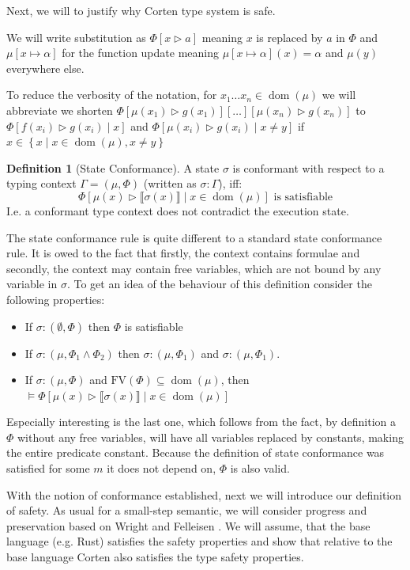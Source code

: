 \documentclass[twoside, english]{sdqthesis}
\newcommand{\set}[1]{\left\{ #1 \right\}}
\newcommand{\bbracket}[1]{\llbracket #1 \rrbracket}
\newcommand{\tr}[0]{\triangleright}
\DeclareMathOperator{\dom}{dom}
\theoremstyle{definition}
\newtheorem{definition}[theorem]{Definition}
\begin{document}
Next, we will to justify why Corten type system is safe.


We will write substitution as $\Phi[ x \tr a ]$ meaning $x$ is replaced by $a$ in $\Phi$ and $\mu[x \mapsto \alpha]$ for the function update meaning $\mu[x \mapsto \alpha](x) = \alpha$ and $\mu(y)$ everywhere else.

To reduce the verbosity of the notation, for $x_1 \dots x_n \in \dom(\mu)$ we will abbreviate
we shorten $\Phi[\mu(x_1) \tr g(x_1)][\dots][\mu(x_n) \tr g(x_n)]$ to $\Phi[f(x_i) \tr g(x_i) \mid x]$ and $\Phi[\mu(x_i) \tr g(x_i) \mid x \neq y]$ if $x \in \set{ x \mid x \in \dom(\mu), x \neq y }$



\begin{definition}[State Conformance]\label{def:state-conformance}
  A state $\sigma$ is conformant with respect to a typing context $\Gamma = (\mu, \Phi)$ (written as $\sigma : \Gamma$), iff:
  $$
    \Phi[\mu(x) \triangleright \bbracket{\sigma(x)} \mid x \in \dom(\mu)] \text{ is satisfiable}
  $$
  I.e. a conformant type context does not contradict the execution state.
\end{definition}

The state conformance rule is quite different to a standard state conformance rule. It is owed to the fact that firstly, the context contains formulae and secondly, the context may contain free variables, which are not bound by any variable in $\sigma$.
To get an idea of the behaviour of this definition consider the following properties:
\begin{itemize}
  \item If $\sigma : (\emptyset, \Phi)$ then $\Phi$ is satisfiable
  \item If $\sigma : (\mu, \Phi_1 \wedge \Phi_2)$ then $\sigma : (\mu, \Phi_1)$ and $\sigma : (\mu, \Phi_1)$.
  \item If $\sigma : (\mu, \Phi)$ and $\text{FV}(\Phi) \subseteq \dom(\mu)$, then $\vDash \Phi[\mu(x) \triangleright \bbracket{\sigma(x)} \mid x \in \dom(\mu)]$
\end{itemize}

Especially interesting is the last one, which follows from the fact, by definition a $\Phi$ without any free variables, will have all variables replaced by constants, making the entire predicate constant. Because the definition of state conformance was satisfied for some $m$ it does not depend on, $\Phi$ is also valid.

With the notion of conformance established, next we will introduce our definition of safety.
As usual for a small-step semantic, we will consider progress and preservation based on Wright and Felleisen \cite{wright_syntactic_1994}. 
We will assume, that the base language (e.g. Rust) satisfies the safety properties and show that relative to the base language Corten also satisfies the type safety properties.
\end{document}
